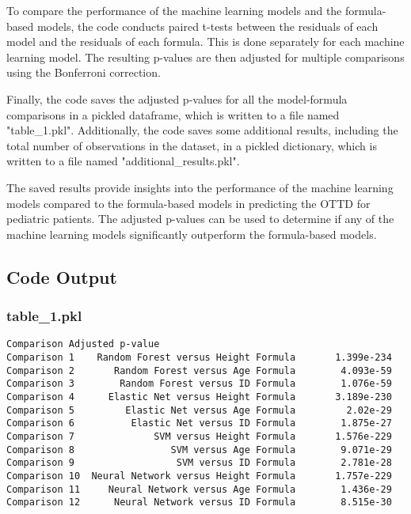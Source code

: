 \documentclass[11pt]{article}
\begin{document}
To compare the performance of the machine learning models and the formula-based models, the code conducts paired t-tests between the residuals of each model and the residuals of each formula. This is done separately for each machine learning model. The resulting p-values are then adjusted for multiple comparisons using the Bonferroni correction.

Finally, the code saves the adjusted p-values for all the model-formula comparisons in a pickled dataframe, which is written to a file named "table\_1.pkl". Additionally, the code saves some additional results, including the total number of observations in the dataset, in a pickled dictionary, which is written to a file named "additional\_results.pkl".

The saved results provide insights into the performance of the machine learning models compared to the formula-based models in predicting the OTTD for pediatric patients. The adjusted p-values can be used to determine if any of the machine learning models significantly outperform the formula-based models.

\subsection{Code Output}

\subsubsection*{table\_1.pkl}

\begin{Verbatim}[tabsize=4]
                                         Comparison Adjusted p-value
Comparison 1    Random Forest versus Height Formula       1.399e-234
Comparison 2       Random Forest versus Age Formula        4.093e-59
Comparison 3        Random Forest versus ID Formula        1.076e-59
Comparison 4      Elastic Net versus Height Formula       3.189e-230
Comparison 5         Elastic Net versus Age Formula         2.02e-29
Comparison 6          Elastic Net versus ID Formula        1.875e-27
Comparison 7              SVM versus Height Formula       1.576e-229
Comparison 8                 SVM versus Age Formula        9.071e-29
Comparison 9                  SVM versus ID Formula        2.781e-28
Comparison 10  Neural Network versus Height Formula       1.757e-229
Comparison 11     Neural Network versus Age Formula        1.436e-29
Comparison 12      Neural Network versus ID Formula        8.515e-30
\end{Verbatim}
\end{document}
